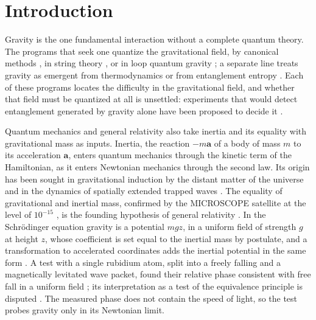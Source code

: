 \documentclass[aps,prd,onecolumn,tightenlines,nofootinbib,notitlepage,11pt,floatfix]{revtex4-2}
\theoremstyle{indentedtheorem}
\begin{document}
\maketitle

\section{Introduction}
\label{sec:intro}

Gravity is the one fundamental interaction without a complete quantum theory. The programs that seek one quantize the gravitational field, by canonical methods \citep{DeWitt1967Quantum}, in string theory \citep{Green1987Superstring,Polchinski1998String}, or in loop quantum gravity \citep{Ashtekar1986Variables,Rovelli2004Quantum}; a separate line treats gravity as emergent from thermodynamics or from entanglement entropy \citep{Jacobson1995Thermodynamics,Padmanabhan2010Thermodynamics,Verlinde2011Origin,Jacobson2016Entanglement,Verlinde2017Emergent}. Each of these programs locates the difficulty in the gravitational field, and whether that field must be quantized at all is unsettled: experiments that would detect entanglement generated by gravity alone have been proposed to decide it \citep{Bose2017Spin,Marletto2017Gravitationally}.

Quantum mechanics and general relativity also take inertia and its equality with gravitational mass as inputs. Inertia, the reaction $-m\mathbf{a}$ of a body of mass $m$ to its acceleration $\mathbf{a}$, enters quantum mechanics through the kinetic term of the Hamiltonian, as it enters Newtonian mechanics through the second law. Its origin has been sought in gravitational induction by the distant matter of the universe \citep{Sciama1953Origin} and in the dynamics of spatially extended trapped waves \citep{Jennison1977Approach,Jennison1983Wave}. The equality of gravitational and inertial mass, confirmed by the MICROSCOPE satellite at the level of $10^{-15}$ \citep{Touboul2017Microscope,Touboul2022Final}, is the founding hypothesis of general relativity \citep{Einstein1907Relativitatsprinzip}. In the Schr\"odinger equation gravity is a potential $mgz$, in a uniform field of strength $g$ at height $z$, whose coefficient is set equal to the inertial mass by postulate, and a transformation to accelerated coordinates adds the inertial potential in the same form \citep{Shukla2010Gauge}. A test with a single rubidium atom, split into a freely falling and a magnetically levitated wave packet, found their relative phase consistent with free fall in a uniform field \citep{Dobkowski2026Observation}; its interpretation as a test of the equivalence principle is disputed \citep{AsenbaumOverstreet2025Magnetic,Dobkowski2025Reply}. The measured phase does not contain the speed of light, so the test probes gravity only in its Newtonian limit.
\end{document}
